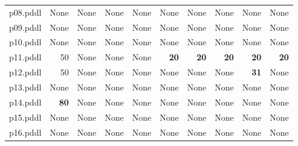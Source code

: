 \documentclass{article}
\begin{document}
\begin{tabular}{@{}lrrrrrrrrr@{}}
p08.pddl & \multicolumn{1}{|l|}{None} & \multicolumn{1}{|l|}{None} & \multicolumn{1}{|l|}{None} & \multicolumn{1}{|l|}{None} & \multicolumn{1}{|l|}{None} & \multicolumn{1}{|l|}{None} & \multicolumn{1}{|l|}{None} & \multicolumn{1}{|l|}{None} & \multicolumn{1}{|l|}{None} \\
p09.pddl & \multicolumn{1}{|l|}{None} & \multicolumn{1}{|l|}{None} & \multicolumn{1}{|l|}{None} & \multicolumn{1}{|l|}{None} & \multicolumn{1}{|l|}{None} & \multicolumn{1}{|l|}{None} & \multicolumn{1}{|l|}{None} & \multicolumn{1}{|l|}{None} & \multicolumn{1}{|l|}{None} \\
p10.pddl & \multicolumn{1}{|l|}{None} & \multicolumn{1}{|l|}{None} & \multicolumn{1}{|l|}{None} & \multicolumn{1}{|l|}{None} & \multicolumn{1}{|l|}{None} & \multicolumn{1}{|l|}{None} & \multicolumn{1}{|l|}{None} & \multicolumn{1}{|l|}{None} & \multicolumn{1}{|l|}{None} \\
p11.pddl & 50 & \multicolumn{1}{|l|}{None} & \multicolumn{1}{|l|}{None} & \multicolumn{1}{|l|}{None} & \textbf{20} & \textbf{20} & \textbf{20} & \textbf{20} & \textbf{20} \\
p12.pddl & 50 & \multicolumn{1}{|l|}{None} & \multicolumn{1}{|l|}{None} & \multicolumn{1}{|l|}{None} & \multicolumn{1}{|l|}{None} & \multicolumn{1}{|l|}{None} & \multicolumn{1}{|l|}{None} & \textbf{31} & \multicolumn{1}{|l|}{None} \\
p13.pddl & \multicolumn{1}{|l|}{None} & \multicolumn{1}{|l|}{None} & \multicolumn{1}{|l|}{None} & \multicolumn{1}{|l|}{None} & \multicolumn{1}{|l|}{None} & \multicolumn{1}{|l|}{None} & \multicolumn{1}{|l|}{None} & \multicolumn{1}{|l|}{None} & \multicolumn{1}{|l|}{None} \\
p14.pddl & \textbf{80} & \multicolumn{1}{|l|}{None} & \multicolumn{1}{|l|}{None} & \multicolumn{1}{|l|}{None} & \multicolumn{1}{|l|}{None} & \multicolumn{1}{|l|}{None} & \multicolumn{1}{|l|}{None} & \multicolumn{1}{|l|}{None} & \multicolumn{1}{|l|}{None} \\
p15.pddl & \multicolumn{1}{|l|}{None} & \multicolumn{1}{|l|}{None} & \multicolumn{1}{|l|}{None} & \multicolumn{1}{|l|}{None} & \multicolumn{1}{|l|}{None} & \multicolumn{1}{|l|}{None} & \multicolumn{1}{|l|}{None} & \multicolumn{1}{|l|}{None} & \multicolumn{1}{|l|}{None} \\
p16.pddl & \multicolumn{1}{|l|}{None} & \multicolumn{1}{|l|}{None} & \multicolumn{1}{|l|}{None} & \multicolumn{1}{|l|}{None} & \multicolumn{1}{|l|}{None} & \multicolumn{1}{|l|}{None} & \multicolumn{1}{|l|}{None} & \multicolumn{1}{|l|}{None} & \multicolumn{1}{|l|}{None} \\

\end{tabular}
\end{document}
